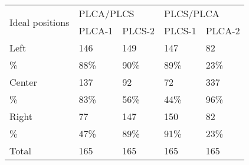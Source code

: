 \begin{table}[]
\begin{tabular}{lllll}
\cline{1-1}
\multicolumn{1}{|l|}{\multirow{2}{*}{Ideal positions}} & \multicolumn{2}{l}{PLCA/PLCS} & \multicolumn{2}{l}{PLCS/PLCA} \\
\multicolumn{1}{|l|}{}                                 & PLCA-1        & PLCS-2        & PLCS-1        & PLCA-2        \\ \cline{1-1}
\multicolumn{1}{|l|}{Left}                             & 146           & 149           & 147           & 82            \\ \cline{1-1}
\%                                                     & 88\%          & 90\%          & 89\%          & 23\%          \\
Center                                                 & 137           & 92            & 72            & 337           \\
\%                                                     & 83\%          & 56\%          & 44\%          & 96\%          \\
Right                                                  & 77            & 147           & 150           & 82            \\
\%                                                     & 47\%          & 89\%          & 91\%          & 23\%          \\
Total                                                  & 165           & 165           & 165           & 165          
\end{tabular}
\end{table}